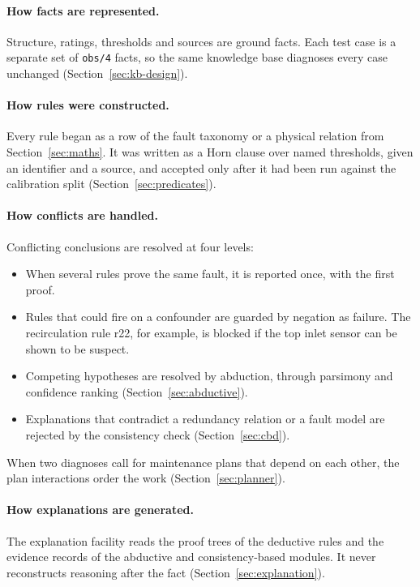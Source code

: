 \paragraph{How facts are represented.} Structure, ratings, thresholds and sources are ground facts. Each test case is a separate set of \texttt{obs/4} facts, so the same knowledge base diagnoses every case unchanged (Section~\ref{sec:kb-design}).

\paragraph{How rules were constructed.} Every rule began as a row of the fault taxonomy or a physical relation from Section~\ref{sec:maths}. It was written as a Horn clause over named thresholds, given an identifier and a source, and accepted only after it had been run against the calibration split (Section~\ref{sec:predicates}).

\paragraph{How conflicts are handled.} Conflicting conclusions are resolved at four levels:
\begin{itemize}
  \item When several rules prove the same fault, it is reported once, with the first proof.
  \item Rules that could fire on a confounder are guarded by negation as failure. The recirculation rule r22, for example, is blocked if the top inlet sensor can be shown to be suspect.
  \item Competing hypotheses are resolved by abduction, through parsimony and confidence ranking (Section~\ref{sec:abductive}).
  \item Explanations that contradict a redundancy relation or a fault model are rejected by the consistency check (Section~\ref{sec:cbd}).
\end{itemize}
When two diagnoses call for maintenance plans that depend on each other, the plan interactions order the work (Section~\ref{sec:planner}).

\paragraph{How explanations are generated.} The explanation facility reads the proof trees of the deductive rules and the evidence records of the abductive and consistency-based modules. It never reconstructs reasoning after the fact (Section~\ref{sec:explanation}).

